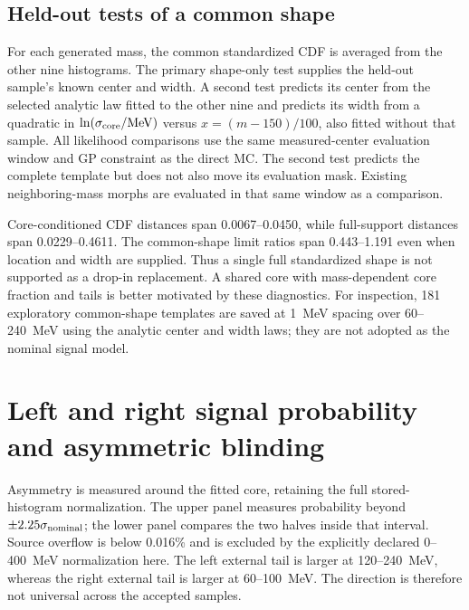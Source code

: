 \subsection{Held-out tests of a common shape}
For each generated mass, the common standardized CDF is averaged from
the other nine histograms. The primary shape-only test supplies the held-out
sample's known center and width. A second test predicts its center from
the selected analytic law fitted to the other nine and predicts its
width from a quadratic in $\ln(\sigma_{\rm core}/\mathrm{MeV})$ versus
$x=(m-150)/100$, also fitted without that sample. All likelihood comparisons
use the same measured-center evaluation window and GP constraint as the
direct MC. The second test predicts the complete template but does not
also move its evaluation mask. Existing neighboring-mass morphs are
evaluated in that same window as a comparison.
\begin{table}[H]\centering\scriptsize

\caption{Held-out CDF distances and observed upper-limit ratios relative
to direct MC. Core probability is conditional on the stored histogram
range; $D_{core}$ conditions on $|u|<2$. Full distances use the declared
analysis support. ``Predictive'' estimates center and width as well as
shape without the held-out histogram.}
\end{table}
Core-conditioned CDF distances span 0.0067--0.0450, while full-support
distances span 0.0229--0.4611. The common-shape limit ratios span
0.443--1.191 even when location and width are supplied. Thus a single
full standardized shape is not supported as a drop-in replacement.
A shared core with mass-dependent core fraction and tails is better
motivated by these diagnostics. For inspection, 181 exploratory common-shape
templates are saved at 1~MeV spacing over 60--240~MeV using the analytic
center and width laws; they are not adopted as the nominal signal model.

\clearpage
\section{Left and right signal probability and asymmetric blinding}
Asymmetry is measured around the fitted core, retaining the full
stored-histogram normalization. The upper panel measures probability
beyond $\pm2.25\sigma_{\rm nominal}$; the lower panel compares the two
halves inside that interval. Source overflow is below 0.016\% and is
excluded by the explicitly declared 0--400~MeV normalization here.
The left external tail is larger at 120--240~MeV, whereas the right
external tail is larger at 60--100~MeV. The direction is therefore not
universal across the accepted samples.

